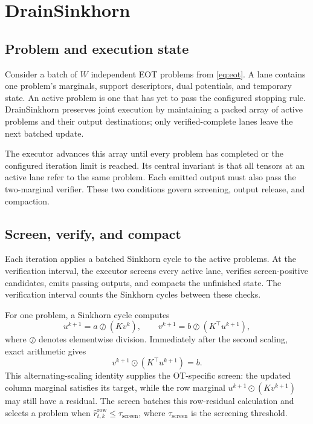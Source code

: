 \section{DrainSinkhorn}
\label{sec:method}



\subsection{Problem and execution state}

Consider a batch of $W$ independent EOT problems from \cref{eq:eot}. A lane contains one problem's marginals, support descriptors, dual potentials, and temporary state. An active problem is one that has yet to pass the configured stopping rule. DrainSinkhorn preserves joint execution by maintaining a packed array of active problems and their output destinations; only verified-complete lanes leave the next batched update.

The executor advances this array until every problem has completed or the configured iteration limit is reached. Its central invariant is that all tensors at an active lane refer to the same problem. Each emitted output must also pass the two-marginal verifier. These two conditions govern screening, output release, and compaction.

\subsection{Screen, verify, and compact}

Each iteration applies a batched Sinkhorn cycle to the active problems. At the verification interval, the executor screens every active lane, verifies screen-positive candidates, emits passing outputs, and compacts the unfinished state. The verification interval counts the Sinkhorn cycles between these checks.


For one problem, a Sinkhorn cycle computes
\begin{equation}
u^{k+1}=a\oslash(Kv^k),\qquad
v^{k+1}=b\oslash(K^\top u^{k+1}),
\label{eq:sinkhorn-cycle}
\end{equation}
where $\oslash$ denotes elementwise division. Immediately after the second scaling, exact arithmetic gives
\begin{equation}
v^{k+1}\odot(K^\top u^{k+1})=b.
\label{eq:updated-marginal}
\end{equation}
This alternating-scaling identity supplies the OT-specific screen: the updated column marginal satisfies its target, while the row marginal $u^{k+1}\odot(Kv^{k+1})$ may still have a residual. The screen batches this row-residual calculation and selects a problem when $\widehat r^{\mathrm{row}}_{t,k}\leq\tau_{\mathrm{screen}}$, where $\tau_{\mathrm{screen}}$ is the screening threshold.

